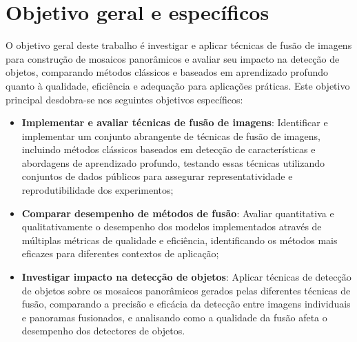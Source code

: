 
\section{Objetivo geral e específicos}\label{sec:objetivos}

O objetivo geral deste trabalho é investigar e aplicar técnicas de fusão de imagens para construção de mosaicos panorâmicos e avaliar seu impacto na detecção de objetos, comparando métodos clássicos e baseados em aprendizado profundo quanto à qualidade, eficiência e adequação para aplicações práticas. Este objetivo principal desdobra-se nos seguintes objetivos específicos:

\begin{itemize}
    \item \textbf{Implementar e avaliar técnicas de fusão de imagens}: Identificar e implementar um conjunto abrangente de técnicas de fusão de imagens, incluindo métodos clássicos baseados em detecção de características e abordagens de aprendizado profundo, testando essas técnicas utilizando conjuntos de dados públicos para assegurar representatividade e reprodutibilidade dos experimentos;

    \item \textbf{Comparar desempenho de métodos de fusão}: Avaliar quantitativa e qualitativamente o desempenho dos modelos implementados através de múltiplas métricas de qualidade e eficiência, identificando os métodos mais eficazes para diferentes contextos de aplicação;

    \item \textbf{Investigar impacto na detecção de objetos}: Aplicar técnicas de detecção de objetos sobre os mosaicos panorâmicos gerados pelas diferentes técnicas de fusão, comparando a precisão e eficácia da detecção entre imagens individuais e panoramas fusionados, e analisando como a qualidade da fusão afeta o desempenho dos detectores de objetos.
\end{itemize}



